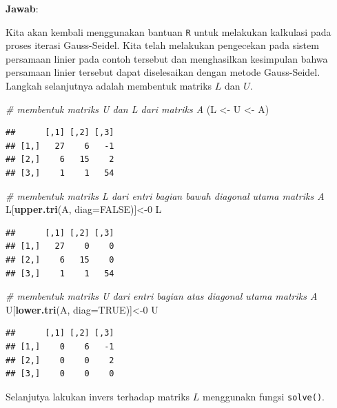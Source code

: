 \documentclass[]{book}
\newenvironment{Shaded}{\begin{snugshade}}{\end{snugshade}}
\newcommand{\CommentTok}[1]{\textcolor[rgb]{0.56,0.35,0.01}{\textit{#1}}}
\newcommand{\DataTypeTok}[1]{\textcolor[rgb]{0.13,0.29,0.53}{#1}}
\newcommand{\DecValTok}[1]{\textcolor[rgb]{0.00,0.00,0.81}{#1}}
\newcommand{\KeywordTok}[1]{\textcolor[rgb]{0.13,0.29,0.53}{\textbf{#1}}}
\newcommand{\NormalTok}[1]{#1}
\newcommand{\OtherTok}[1]{\textcolor[rgb]{0.56,0.35,0.01}{#1}}
\newcommand{\StringTok}[1]{\textcolor[rgb]{0.31,0.60,0.02}{#1}}
\theoremstyle{definition}
\theoremstyle{definition}
\theoremstyle{definition}
\theoremstyle{remark}
\begin{document}
\textbf{Jawab}:

Kita akan kembali menggunakan bantuan \texttt{R} untuk melakukan kalkulasi pada proses iterasi Gauss-Seidel. Kita telah melakukan pengecekan pada sistem persamaan linier pada contoh tersebut dan menghasilkan kesimpulan bahwa persamaan linier tersebut dapat diselesaikan dengan metode Gauss-Seidel. Langkah selanjutnya adalah membentuk matriks \(L\) dan \(U\).

\begin{Shaded}
\begin{Highlighting}[]
\CommentTok{# membentuk matriks U dan L dari matriks A}
\NormalTok{(L <-}\StringTok{ }\NormalTok{U <-}\StringTok{ }\NormalTok{A)}
\end{Highlighting}
\end{Shaded}

\begin{verbatim}
##      [,1] [,2] [,3]
## [1,]   27    6   -1
## [2,]    6   15    2
## [3,]    1    1   54
\end{verbatim}

\begin{Shaded}
\begin{Highlighting}[]
\CommentTok{# membentuk matriks L dari entri bagian bawah diagonal utama matriks A}
\NormalTok{L[}\KeywordTok{upper.tri}\NormalTok{(A, }\DataTypeTok{diag=}\OtherTok{FALSE}\NormalTok{)]<-}\DecValTok{0}
\NormalTok{L}
\end{Highlighting}
\end{Shaded}

\begin{verbatim}
##      [,1] [,2] [,3]
## [1,]   27    0    0
## [2,]    6   15    0
## [3,]    1    1   54
\end{verbatim}

\begin{Shaded}
\begin{Highlighting}[]
\CommentTok{# membentuk matriks U dari entri bagian atas diagonal utama matriks A}
\NormalTok{U[}\KeywordTok{lower.tri}\NormalTok{(A, }\DataTypeTok{diag=}\OtherTok{TRUE}\NormalTok{)]<-}\DecValTok{0}
\NormalTok{U}
\end{Highlighting}
\end{Shaded}

\begin{verbatim}
##      [,1] [,2] [,3]
## [1,]    0    6   -1
## [2,]    0    0    2
## [3,]    0    0    0
\end{verbatim}

Selanjutya lakukan invers terhadap matriks \(L\) menggunakn fungsi \texttt{solve()}.
\end{document}
